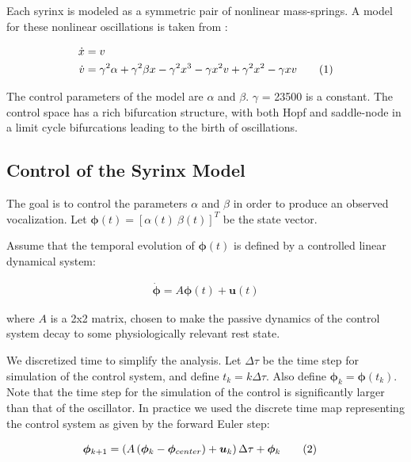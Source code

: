 \documentclass{article} %
\newcommand\numberthis{\addtocounter{equation}{1}\tag{\theequation}}
\begin{document}
Each syrinx is modeled as a symmetric pair of nonlinear mass-springs. A model for
these nonlinear oscillations is taken from \cite{Sitt2010}:

\begin{align*}
\dot{x}&=\begin{aligned}v\end{aligned} \\
\dot{v}&=\begin{aligned}\gamma^2 \alpha + \gamma^2 \beta x - \gamma^2 x^3 - \gamma x^2 v + \gamma^2 x^2 - \gamma x v\end{aligned} \numberthis \label{eq_oscillator}
\end{align*}

The control parameters of the model are $\alpha$ and $\beta$. $\gamma$ = 23500 is a constant.
The control space has a rich bifurcation structure, with both Hopf and saddle-node in a
limit cycle bifurcations leading to the birth of oscillations.

\subsection{Control of the Syrinx Model}

The goal is to control the parameters $\alpha$ and $\beta$ in order to produce an observed
vocalization. Let $\bm{\phi}(t) = \left[ \alpha(t) ~ \beta(t) \right]^T$ be the state vector.

Assume that the temporal evolution of $\bm{\phi}(t)$ is defined by a controlled linear dynamical
system:

\begin{align*}
\dot{\bm{\phi}}=A\bm{\phi}(t) + \bm{u}(t)
\end{align*}

where $A$ is a 2x2 matrix, chosen to make the passive dynamics of the control system decay
to some physiologically relevant rest state.

We discretized time to simplify the analysis. Let $\Delta\tau$ be the time step for
simulation of the control system, and define $t_k = k\Delta\tau$. Also define
$\bm{\phi}_k = \bm{\phi}(t_k)$. Note that the time step for the simulation of the
control is significantly larger than that of the oscillator. In practice we used the
discrete time map representing the control system as given by the forward Euler step:

\begin{align*}
\bm{\phi}_{k+1} &= \begin{aligned}\left( A \left( \bm{\phi}_k - \bm{\phi}_{center} \right) + \bm{u}_k \right) \Delta\tau + \bm{\phi}_{k}\end{aligned} \numberthis \label{eq_control}
\end{align*}
\end{document}
